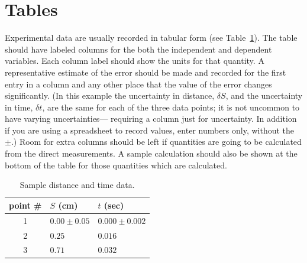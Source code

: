 \newapp
\section*{Tables}
     Experimental data are usually recorded in tabular
form (see Table~\ref{tableb2}).  The table should have labeled columns for the
both the independent and dependent variables.  Each column label should show
the units for that quantity.  A representative estimate of the
error should be made and recorded for the first entry in a column
and any other place that the value of the error changes
significantly.  (In this example the uncertainty in distance, $\delta S$,
and the uncertainty in time, $\delta t$, are the same for each
of the three data points; it is not uncommon to have varying uncertainties---
requiring a column just for uncertainty.  In addition if you are using a spreadsheet
to record values, enter numbers only, without the $\pm$.) Room for extra columns should be left if
quantities are going to be calculated from the direct
measurements.  A sample calculation should also be shown at the
bottom of the table for those quantities which are calculated.
\begin{table}[h]
\begin{center}
\begin{tabular}{|cll|}
\hline
point \# & $S$ (cm) & $t$ (sec) \\ \hline
1 & $0.00 \pm 0.05$ & $0.000 \pm 0.002$ \\
2 & $0.25$ & $0.016$ \\
3 & $0.71$ & $0.032$
\\ \hline
\end{tabular}
\end{center}
\caption{Sample distance and time data.  \label{tableb2}}
\end{table}
